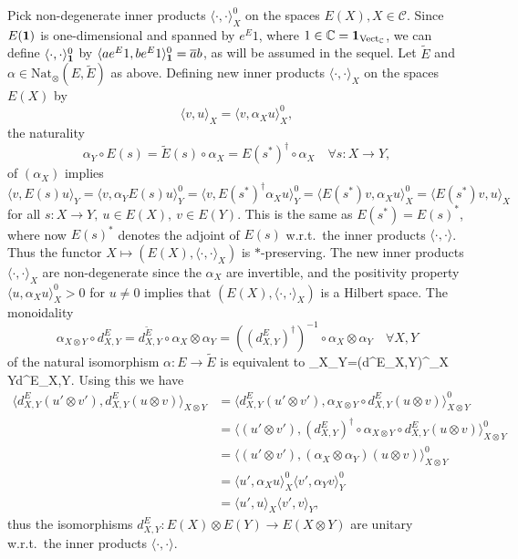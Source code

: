 \documentclass[11pt]{article}
\theoremstyle{definition}
\theoremstyle{definition}
\theoremstyle{remark}
\newcommand{\Vect}{\mathrm{Vect}}
\def\2#1{{\mathcal #1}}
\def\7#1{{\mathbb #1}}
\def\1#1{{\bf #1}}
\def\ol#1{{\overline #1}}
\newcommand{\mcirc}{\circ}
\newcommand{\rarr}{\rightarrow}
\newcommand{\Nat}{\mathrm{Nat}}
\begin{document}
\prf Pick non-degenerate inner products $\langle\cdot,\cdot\rangle_X^0$ on the spaces $E(X),X\in\2C$. 
Since $E(\11)$ is one-dimensional and
spanned by $e^E1$, where $1\in\7C=\11_{\Vect_\7C}$, we can define $\langle\cdot,\cdot\rangle_\11^0$ by
$\langle ae^E1,b e^E1\rangle_\11^0=\ol{a}b$, as will be assumed in the sequel. Let $\widetilde{E}$
and $\alpha\in\Nat_\otimes(E,\widetilde{E})$ as above. Defining new inner products
$\langle\cdot,\cdot\rangle_X$ on the spaces $E(X)$ by  
\[ \langle v,u\rangle_X=\langle v,\alpha_X u\rangle^0_X, \] the
naturality
\[ \alpha_Y\circ E(s) = \widetilde{E}(s)\circ\alpha_X=E(s^*)^\dagger\circ\alpha_X
   \quad\forall s:X\rarr Y, \]
of $(\alpha_X)$ implies
\[ \langle v,E(s)u\rangle_Y=\langle v,\alpha_Y E(s)u\rangle^0_Y=\langle v,E(s^*)^\dagger\alpha_Xu\rangle^0_Y 
   =\langle E(s^*)v,\alpha_Xu\rangle^0_X  =\langle E(s^*)v, u\rangle_X \]
for all $s:X\rarr Y,\ u\in E(X),\ v\in E(Y)$. This is the same as $E(s^*)=E(s)^*$, where now
$E(s)^*$ denotes the adjoint of $E(s)$ w.r.t.\ the inner products $\langle\cdot,\cdot\rangle$. Thus
the functor $X\mapsto(E(X),\langle\cdot,\cdot\rangle_X)$ is $*$-preserving. The new inner products 
$\langle\cdot,\cdot\rangle_X$ are non-degenerate since the $\alpha_X$ are invertible,
and the positivity property $\langle u,\alpha_Xu\rangle_X^0> 0$ for $u\ne 0$ implies that
$(E(X),\langle\cdot,\cdot\rangle_X)$ is a Hilbert space. The monoidality
\[ \alpha_{X\otimes Y}\mcirc d^E_{X,Y}=d^{\widetilde{E}}_{X,Y}\mcirc
\alpha_X\otimes\alpha_Y =((d^E_{X,Y})^\dagger)^{-1}\mcirc
\alpha_X\otimes\alpha_Y \quad\forall X,Y \] of the natural isomorphism
$\alpha:E\rarr\widetilde{E}$ is equivalent to \be
\alpha_X\otimes\alpha_Y=(d^E_{X,Y})^\dagger\mcirc\alpha_{X\otimes
  Y}\mcirc d^E_{X,Y}. \label{eq-alpha}\ee Using this we have 
 \begin{align*}
\langle d^E_{X,Y}(u'\otimes v'),d^E_{X,Y}(u\otimes v)
  \rangle_{X\otimes Y}
  &= \langle d^E_{X,Y}(u'\otimes v'),\alpha_{X\otimes Y}\circ d^E_{X,Y}(u\otimes v)\rangle^0_{X\otimes Y} \\
& = \langle (u'\otimes v'),(d^E_{X,Y})^\dagger\mcirc\alpha_{X\otimes
  Y}\mcirc d^E_{X,Y}(u\otimes v)\rangle^0_{X\otimes Y} \\
&= \langle (u'\otimes v'), (\alpha_X\otimes\alpha_Y)(u\otimes v)\rangle^0_{X\otimes Y}  \\
& = \langle u',\alpha_X u\rangle^0_X \langle v',\alpha_Y v\rangle^0_Y\\
&= \langle u',u\rangle_X \langle v', v\rangle_Y,
\end{align*}
thus the
isomorphisms $d^E_{X,Y}:E(X)\otimes E(Y)\rarr E(X\otimes Y)$ are
unitary w.r.t.\ the inner products $\langle\cdot,\cdot\rangle$.
\end{document}
